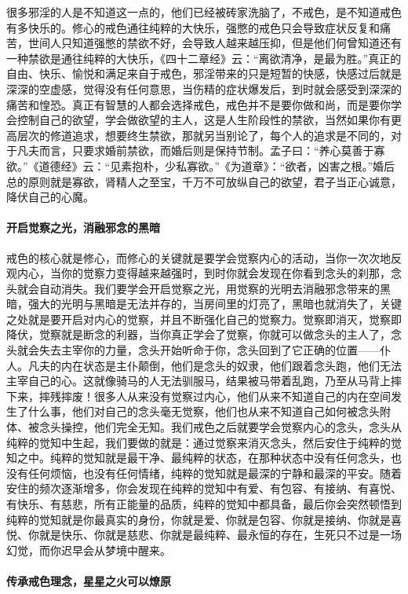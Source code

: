 很多邪淫的人是不知道这一点的，他们已经被砖家洗脑了，不戒色，是不知道戒色有多快乐的。修心的戒色通往纯粹的大快乐，强憋的戒色只会导致症状反复和痛苦，世间人只知道强憋的禁欲不好，会导致人越来越压抑，但是他们何曾知道还有一种禁欲是通往纯粹的大快乐，《四十二章经》云：“离欲清净，是最为胜。”真正的自由、快乐、愉悦和满足来自于戒色，邪淫带来的只是短暂的快感，快感过后就是深深的空虚感，觉得没有任何意思，当伤精的症状爆发后，到时就会感受到深深的痛苦和惶恐。真正有智慧的人都会选择戒色，戒色并不是要你做和尚，而是要你学会控制自己的欲望，学会做欲望的主人，这是人生阶段性的禁欲，当然如果你有更高层次的修道追求，想要终生禁欲，那就另当别论了，每个人的追求是不同的，对于凡夫而言，只要求婚前禁欲，而婚后则是保持节制。孟子曰：“养心莫善于寡欲。”《道德经》云：“见素抱朴，少私寡欲。”《为道章》：“欲者，凶害之根。”婚后总的原则就是寡欲，肾精人之至宝，千万不可放纵自己的欲望，君子当正心诚意，降伏自己的心魔。

\paragraph{开启觉察之光，消融邪念的黑暗}

戒色的核心就是修心，而修心的关键就是要学会觉察内心的活动，当你一次次地反观内心，当你的觉察力变得越来越强时，到时你就会发现在你看到念头的刹那，念头就会自动消失。我们要学会开启觉察之光，用觉察的光明去消融邪念带来的黑暗，强大的光明与黑暗是无法并存的，当房间里的灯亮了，黑暗也就消失了，关键之处就是要开启对内心的觉察，并且不断强化自己的觉察力。觉察即消灭，觉察即降伏，觉察就是断念的利器，当你真正学会了觉察，你就可以做念头的主人了，念头就会失去主宰你的力量，念头开始听命于你，念头回到了它正确的位置——仆人。凡夫的内在状态是主仆颠倒，他们是念头的奴隶，他们跟着念头跑，他们无法主宰自己的心。这就像骑马的人无法驯服马，结果被马带着乱跑，乃至从马背上摔下来，摔残摔废！很多人从来没有觉察过内心，他们从来不知道自己的内在空间发生了什么事，他们对自己的念头毫无觉察，他们也从来不知道自己如何被念头附体、被念头操控，他们完全无知。我们戒色之后就要学会觉察内心的念头，念头从纯粹的觉知中生起，我们要做的就是：通过觉察来消灭念头，然后安住于纯粹的觉知之中。纯粹的觉知就是最干净、最纯粹的状态，在那种状态中没有任何念头，也没有任何烦恼，也没有任何情绪，纯粹的觉知就是最深的宁静和最深的平安。随着安住的频次逐渐增多，你会发现在纯粹的觉知中有爱、有包容、有接纳、有喜悦、有快乐、有慈悲，所有正能量的品质，纯粹的觉知中都具备，最后你会突然顿悟到纯粹的觉知就是你最真实的身份，你就是爱、你就是包容、你就是接纳、你就是喜悦、你就是快乐、你就是慈悲、你就是最纯粹、最永恒的存在，生死只不过是一场幻觉，而你迟早会从梦境中醒来。

\paragraph{传承戒色理念，星星之火可以燎原}

